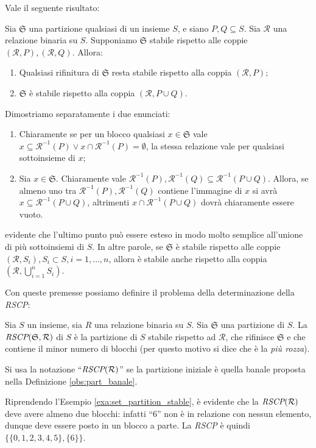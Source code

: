 Vale il seguente risultato:
\begin{proposition}
    \label{prop:rifi_stabile}
    Sia $\mathfrak{S}$ una partizione qualsiasi di un insieme $S$, e siano $P,Q \subseteq S$. Sia $\mathcal{R}$ una relazione binaria su $S$. Supponiamo $\mathfrak{S}$ stabile rispetto alle coppie $(\mathcal{R},P),(\mathcal{R},Q)$. Allora:
    \begin{enumerate}
        \item Qualsiasi rifinitura di $\mathfrak{S}$ resta stabile rispetto alla coppia $(\mathcal{R},P)$;
        \item $\mathfrak{S}$ è stabile rispetto alla coppia $(\mathcal{R},P \cup Q)$.
    \end{enumerate}
\end{proposition}
\begin{proof2}
    Dimostriamo separatamente i due enunciati:
    \begin{enumerate}
        \item Chiaramente se per un blocco qualsiasi $x \in \mathfrak{S}$ vale $x \subseteq \mathcal{R}^{-1}(P) \lor x \cap \mathcal{R}^{-1}(P) = \emptyset$, la stessa relazione vale per qualsiasi sottoinsieme di $x$;
        \item Sia $x \in \mathfrak{S}$. Chiaramente vale $\mathcal{R}^{-1}(P),\mathcal{R}^{-1}(Q) \subseteq \mathcal{R}^{-1}(P \cup Q)$. Allora, se almeno uno tra $\mathcal{R}^{-1}(P),\mathcal{R}^{-1}(Q)$ contiene l'immagine di $x$ si avrà $x \subseteq \mathcal{R}^{-1}(P \cup Q)$, altrimenti $x \cap \mathcal{R}^{-1}(P \cup Q)$ dovrà chiaramente essere vuoto.
    \end{enumerate}
    \vspace*{-0.75cm}
\end{proof2}

\accente evidente che l'ultimo punto può essere esteso in modo molto semplice all'unione di più sottoinsiemi di $S$. In altre parole, se $\mathfrak{S}$ è stabile rispetto alle coppie $(\mathcal{R},S_i), S_i \subset S, i = 1, \dots, n$, allora è stabile anche rispetto alla coppia $(\mathcal{R}, \bigcup_{i=1}^{n} S_i)$.

Con queste premesse possiamo definire il problema della determinazione della \emph{RSCP}:
\begin{definition}
    Sia $S$ un insieme, sia $R$ una relazione binaria su $S$. Sia $\mathfrak{S}$ una partizione di $S$. La $\emph{RSCP}(\mathfrak{S},\mathcal{R})$ di $S$ è la partizione di $S$ stabile rispetto ad $\mathcal{R}$, che rifinisce $\mathfrak{S}$ e che contiene il minor numero di blocchi (per questo motivo si dice che è la \emph{più rozza}).

    Si usa la notazione ``$\emph{RSCP}(\mathcal{R})$'' se la partizione iniziale è quella banale proposta nella Definizione \ref{obs:part_banale}.
\end{definition}
\begin{example}
    Riprendendo l'Esempio \ref*{exa:set_partition_stable}, è evidente che la $\emph{RSCP}(\mathcal{R})$ deve avere almeno due blocchi: infatti ``6'' non è in relazione con nessun elemento, dunque deve essere posto in un blocco a parte. La \emph{RSCP} è quindi $\{\{0,1,2,3,4,5\},\{6\}\}$.
\end{example}

